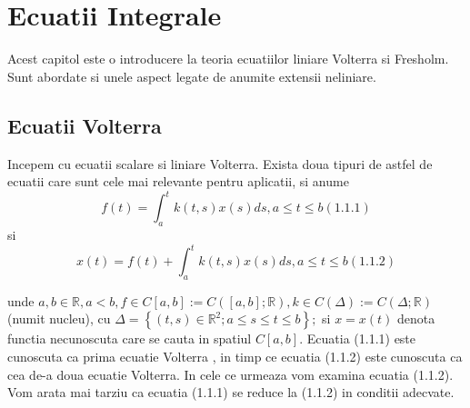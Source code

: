 \documentclass[a4paper,12pt,oneside]{report}
\begin{document}
\maketitle

\tableofcontents

%
%
%
%
\chapter{Ecuatii Integrale}

Acest capitol este o introducere la teoria ecuatiilor liniare Volterra si Fresholm. Sunt abordate si unele aspect legate de anumite extensii neliniare.

\section{Ecuatii Volterra}

Incepem cu ecuatii scalare si liniare Volterra. Exista doua tipuri de astfel de ecuatii care sunt cele mai relevante pentru aplicatii, si anume
\begin{displaymath}
  f\left ( t \right ) = \int_{a}^{t}k\left ( t,s \right )x\left ( s \right )ds,    a\leq t\leq b (1.1.1)
\end{displaymath}
si 
\begin{displaymath}
  x\left ( t \right ) = f\left ( t \right ) + \int_{a}^{t}k\left ( t,s \right )x\left ( s \right )ds, a\leq t\leq b (1.1.2)
\end{displaymath}

unde \(a,b \in \mathbb{R}, a< b, f\in C\left [ a,b \right ]:= C\left ( \left [ a,b \right ];\mathbb{R} \right ) , k\in C\left (\Delta   \right ):= C\left ( \Delta ;\mathbb{R} \right )\) (numit nucleu), cu \(\Delta =\left \{ \left ( t,s \right )\in \mathbb{R}^{2};a\leq s\leq t\leq b \right \};\) si \(x=x\left ( t \right )\) denota functia necunoscuta care se cauta in spatiul \(C\left [ a,b \right ]\). 
Ecuatia (1.1.1) este cunoscuta ca prima ecuatie Volterra , in timp ce ecuatia (1.1.2) este cunoscuta ca cea de-a doua ecuatie Volterra. In cele ce urmeaza vom examina ecuatia (1.1.2). Vom arata mai tarziu ca ecuatia (1.1.1) se reduce la (1.1.2) in conditii adecvate. 




\setlength{\baselineskip}{\normalbaselineskip}
\setlength{\parskip}{0pt}

\end{document}
